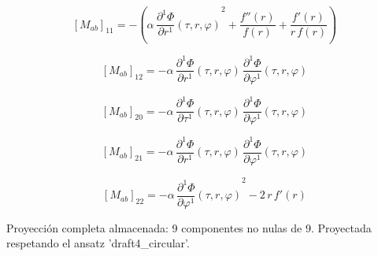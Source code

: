 \documentclass[11pt]{article}
\begin{document}
\begin{dmath*}[breakdepth={5}]
\left[M_{ab}\right]_{11} = -\left(\alpha\,{\frac{\partial^{1} \Phi}{\partial r^{1}}\!\left(\tau, r, \varphi\right)}^{2} + \frac{f''\!\left(r\right)}{f\!\left(r\right)} + \frac{f'\!\left(r\right)}{r\,f\!\left(r\right)}\right)
\end{dmath*}
\par\smallskip
\begin{dmath*}[breakdepth={5}]
\left[M_{ab}\right]_{12} = -\alpha\,\frac{\partial^{1} \Phi}{\partial r^{1}}\!\left(\tau, r, \varphi\right)\,\frac{\partial^{1} \Phi}{\partial \varphi^{1}}\!\left(\tau, r, \varphi\right)
\end{dmath*}
\par\smallskip
\begin{dmath*}[breakdepth={5}]
\left[M_{ab}\right]_{20} = -\alpha\,\frac{\partial^{1} \Phi}{\partial \tau^{1}}\!\left(\tau, r, \varphi\right)\,\frac{\partial^{1} \Phi}{\partial \varphi^{1}}\!\left(\tau, r, \varphi\right)
\end{dmath*}
\par\smallskip
\begin{dmath*}[breakdepth={5}]
\left[M_{ab}\right]_{21} = -\alpha\,\frac{\partial^{1} \Phi}{\partial r^{1}}\!\left(\tau, r, \varphi\right)\,\frac{\partial^{1} \Phi}{\partial \varphi^{1}}\!\left(\tau, r, \varphi\right)
\end{dmath*}
\par\smallskip
\begin{dmath*}[breakdepth={5}]
\left[M_{ab}\right]_{22} = -\alpha\,{\frac{\partial^{1} \Phi}{\partial \varphi^{1}}\!\left(\tau, r, \varphi\right)}^{2} - 2\,r\,f'\!\left(r\right)
\end{dmath*}
\par\smallskip
Proyección completa almacenada: 9 componentes no nulas de 9. Proyectada respetando el ansatz 'draft4\_circular'.\par\medskip
{}
\end{document}
